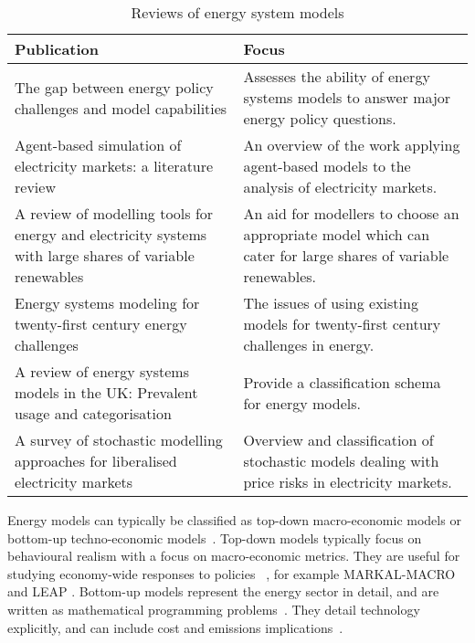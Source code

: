 \begin{table}[]
	\footnotesize
	\caption{Reviews of energy system models}
	\label{tab:litreview:reviews}
	\begin{tabular}{p{7.5cm}p{7.5cm}}
		\toprule
		Publication                                                                                                                 & Focus                                                                                                        \\ \midrule
		The gap between energy policy challenges and model capabilities \cite{Savvidis2019a}                                        & Assesses the ability of energy systems models to answer major energy policy questions.                       \\
		Agent-based simulation of electricity markets: a literature review \cite{Sensfub2007}                                       & An overview of the work applying agent-based models to the analysis of electricity markets.                  \\
		A review of modelling tools for energy and electricity systems with large shares of variable renewables \cite{Ringkjob2018} & An aid for modellers to choose an appropriate model which can cater for large shares of variable renewables. \\
		Energy systems modeling for twenty-first century energy challenges \cite{Pfenninger2014b}                                   & The issues of using existing models for twenty-first century challenges in energy.                           \\
		A review of energy systems models in the UK: Prevalent usage and categorisation \cite{Hall2016a}                            & Provide a classification schema for energy models.                                                           \\
		A survey of stochastic modelling approaches for liberalised electricity markets \cite{Most2010}                             & Overview and classification of stochastic models dealing with price risks in electricity markets.            \\ \bottomrule
	\end{tabular}
\end{table}



Energy models can typically be classified as top-down macro-economic models or bottom-up techno-economic models~\cite{Bohringer1998}. Top-down models typically focus on behavioural realism with a focus on macro-economic metrics. They are useful for studying economy-wide responses to policies ~\cite{Hall2016}, for example MARKAL-MACRO \cite{Fishbone1981} and LEAP \cite{Heaps2016}. Bottom-up models represent the energy sector in detail, and are written as mathematical programming problems~\cite{Gargiulo2013}. They detail technology explicitly, and can include cost and emissions implications~\cite{Hall2016}.

